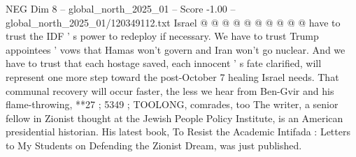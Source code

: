 \begin{textsample}{NEG Dim 8 – global\_north\_2025\_01 – Score -1.00 – global\_north\_2025\_01/120349112.txt}
Israel @ @ @ @ @ @ @ @ @ @ have to trust the IDF ' s power to redeploy if necessary.
We have to trust Trump appointees ' vows that Hamas won't govern and Iran won't go nuclear.
And we have to trust that each hostage saved, each innocent ' s fate clarified, will represent one more step toward the post-October 7 healing Israel needs.
That communal recovery will occur faster, the less we hear from Ben-Gvir and his flame-throwing, **27 ; 5349 ; TOOLONG, comrades, too The writer, a senior fellow in Zionist thought at the Jewish People Policy Institute, is an American presidential historian.
His latest book, To Resist the Academic Intifada : Letters to My Students on Defending the Zionist Dream, was just published.

\end{textsample}
